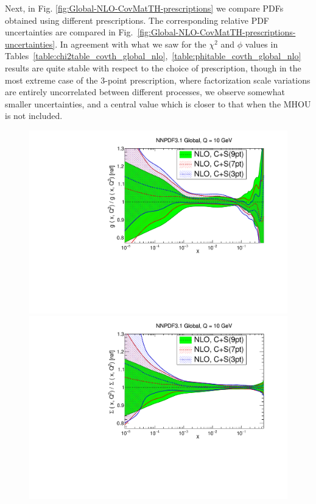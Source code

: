Next, in  Fig. \ref{fig:Global-NLO-CovMatTH-prescriptions} we 
compare PDFs obtained using different prescriptions.
The corresponding relative PDF uncertainties are compared
in Fig.~\ref{fig:Global-NLO-CovMatTH-prescriptions-uncertainties}.
In agreement with what we saw for the $\chi^2$ and $\phi$ values in
Tables~\ref{table:chi2table_covth_global_nlo},~\ref{table:phitable_covth_global_nlo}
results are quite stable with respect to the choice of prescription, though in the most extreme case of the  3-point prescription, where factorization scale variations are entirely uncorrelated between different processes, we observe 
somewhat smaller uncertainties, and a central value
which is closer to that when the MHOU is not included.

\begin{figure}[t]
  \begin{center}
    \includegraphics[scale=0.39]{mhous/plots/xg-Global-NLO-CovMatTH-prescriptions.pdf}
    \includegraphics[scale=0.39]{mhous/plots/xsinglet-Global-NLO-CovMatTH-prescriptions.pdf}

\end{center}
\end{figure}
